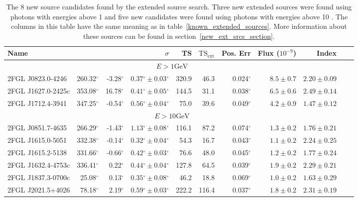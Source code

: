 \documentclass[12pt,preprint]{aastex}
\newcommand{\gev}{\text{GeV}\xspace}
\newcommand{\tsext}{{\ensuremath{\text{TS}_\text{ext}}}\xspace}
\newcommand{\glon}{\text{GLON}\xspace}
\newcommand{\glat}{\text{GLAT}\xspace}
\renewcommand{\deg}{\ensuremath{^\circ}\xspace}
\begin{document}
\clearpage
\begin{table}
  \begin{centering}
    \begin{tabular}{l|rrrrrrrrrr}
      \hline
      \hline
      Name                 &          \glon &          \glat &                    $\sigma$ &         TS &   $\tsext$ &   Pos. Err &      Flux ($10^{-9}$) &                 Index \\
      \hline
      \multicolumn{9}{c}{$E > 1 \gev$} \\
      \hline
      2FGL J0823.0-4246    &     260.32\deg &      -3.28\deg & $  0.37\deg \pm   0.03\deg$ &      320.9 &       46.3 &  0.024\deg & $    8.5 \pm     0.7$ & $   2.20 \pm    0.09$ \\
      2FGL J1627.0-2425c   &     353.08\deg &      16.78\deg & $  0.41\deg \pm   0.05\deg$ &      144.5 &       31.1 &  0.038\deg & $    6.5 \pm     0.6$ & $   2.49 \pm    0.14$ \\
      2FGL J1712.4-3941    &     347.25\deg &      -0.54\deg & $  0.56\deg \pm   0.04\deg$ &       75.0 &       39.6 &  0.049\deg & $    4.2 \pm     0.9$ & $   1.47 \pm    0.12$ \\
      \hline
      \multicolumn{9}{c}{$E > 10 \gev$} \\
      \hline
      2FGL J0851.7-4635    &     266.29\deg &      -1.43\deg & $  1.13\deg \pm   0.08\deg$ &      116.1 &       87.2 &  0.074\deg & $    1.3 \pm     0.2$ & $   1.76 \pm    0.21$ \\
      2FGL J1615.0-5051    &     332.38\deg &      -0.14\deg & $  0.32\deg \pm   0.04\deg$ &       54.3 &       16.7 &  0.043\deg & $    1.1 \pm     0.2$ & $   2.24 \pm    0.25$ \\
      2FGL J1615.2-5138    &     331.66\deg &      -0.66\deg & $  0.42\deg \pm   0.03\deg$ &       76.6 &       48.0 &  0.045\deg & $    1.2 \pm     0.2$ & $   1.77 \pm    0.24$ \\
      2FGL J1632.4-4753c   &     336.41\deg &       0.22\deg & $  0.44\deg \pm   0.04\deg$ &      127.8 &       64.5 &  0.039\deg & $    1.9 \pm     0.2$ & $   2.29 \pm    0.21$ \\
      2FGL J1837.3-0700c   &      25.08\deg &       0.13\deg & $  0.35\deg \pm   0.08\deg$ &       46.2 &       18.8 &  0.069\deg & $    1.0 \pm     0.2$ & $   1.63 \pm    0.29$ \\
      2FGL J2021.5+4026    &      78.18\deg &       2.19\deg & $  0.59\deg \pm   0.03\deg$ &      222.2 &      116.4 &  0.037\deg & $    1.8 \pm     0.2$ & $   2.31 \pm    0.19$ \\
      \hline
    \end{tabular}
    \caption{The 8 new source candidates found by the extended source
    search. Three new extended sources were found using photons with
    energies above 1 \gev and five new candidates were found using photons
    with energies above 10 \gev.  The columns in this table have the same
    meaning as in table~\ref{known_extended_sources}.  More information
    about these sources can be found in section~\ref{new_ext_srcs_section}.
    }
    \label{new_ext_srcs_table}
  \end{centering}
\end{table}
\end{document}
